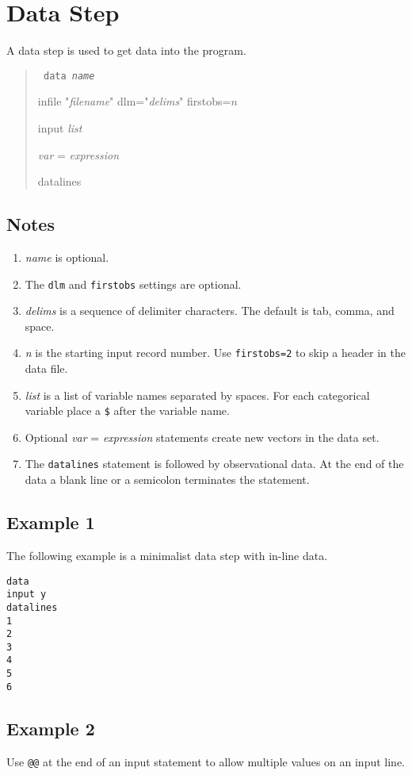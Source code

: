 \documentclass[11pt]{article}
\begin{document}
\newpage

\section{Data Step}
A data step is used to get data into the program.

\begin{quote}
{\tt
data {\it name}

infile "{\it filename}" dlm="{\it delims}" firstobs=$n$

input {\it list}

{\it var} = {\it expression}

datalines
}
\end{quote}

\subsection*{Notes}
\begin{enumerate}
\item
{\it name} is optional.
\item
The {\tt dlm} and {\tt firstobs} settings are optional.
\item
{\it delims} is a sequence of delimiter characters.
The default is tab, comma, and space.
\item
{\it n} is the starting input record number.
Use {\tt firstobs=2} to skip a header in the data file.
\item
{\it list} is a list of variable names separated by spaces.
For each categorical variable place a {\tt\$} after the variable name.
\item
Optional {\it var} = {\it expression} statements
create new vectors in the data set.
\item
The {\tt datalines} statement is followed by observational data.
At the end of the data a blank line or a semicolon terminates the
statement.
\end{enumerate}

\subsection*{Example 1}
The following example is a minimalist data step with in-line data.
\begin{Verbatim}
data
input y
datalines
1
2
3
4
5
6
\end{Verbatim}

\subsection*{Example 2}
Use \verb$@@$ at the end of an input statement to allow multiple
values on an input line.
\end{document}
